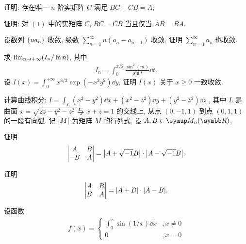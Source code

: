 \documentclass{ctexart}
\begin{document}
\begin{exercise}[resume=exer]
\begin{exercise}
            \item 证明: 存在唯一 $ n $ 阶实矩阵 $ C $ 满足 $ BC + CB = A $;
            \item 证明: 对 $ (1) $ 中的实矩阵 $ C $, $ BC = CB $ 当且仅当 $ AB = BA $. 
        \end{exercise}
        \item 设数列 $ \qty{na_{n}} $ 收敛, 级数 $ \sum_{n=1}^{\infty}n(a_{n} - a_{n-1}) $ 收敛, 证明 $ \sum_{n=1}^{\infty}a_{n} $ 也收敛. 
        \item 求 $ \lim_{n \to +\infty} (I_{n}/\ln n) $, 其中
        \begin{align*}
            I_{n} = \int_{0}^{\pi/2} \frac{\sin^{2}(nt)}{\sin t}\dd{t}.
        \end{align*}
        \sitem 设 $ I(x) = \int_{0}^{+\infty} x^{3/2}\exp(-x^{2}y^{2})\dd{y} $, 证明 $ I(x) $ 关于 $ x\geq 0 $ 一致收敛.
        \item 计算曲线积分: $ I = \int_{L} (x^{2} - y^{2}) \dd{x} + (x^{2} - z^{2}) \dd{y} + (y^{2} - z^{2})\dd{z} $ , 其中 $ L $ 是曲面 $ x = \sqrt{2z - y^{2} - z^{2}} $ 与 $ x + z = 1 $ 的交线上, 从点 $ (0, -1, 1) $ 到点 $ (0, 1, 1) $ 的一段有向弧.
        \sitem 记 $ \abs{M} $ 为矩阵 $ M $ 的行列式, 设 $ A, B\in \MM $, 
        \begin{exercise}
            \item 证明
            \begin{align*}
                \begin{vmatrix}
                    A & B \\ -B & A
                \end{vmatrix} = \abs{A + \sqrt{-1}B}\cdot\abs{A - \sqrt{-1}B}.
            \end{align*}
            \item 证明 
            \begin{align*}
                \begin{vmatrix}
                    A & B \\ B & A
                \end{vmatrix} = \abs{A + B}\cdot\abs{A - B}.
            \end{align*}
        \end{exercise}
        \item 设函数 
        \begin{align*}
            f(x) = \begin{cases}
                \int_{0}^{x}\sin(1/x) \dd{x} & ,x \ne 0\\
                0 & ,x = 0

\end{cases}
\end{align*}
\end{exercise}
\end{document}
